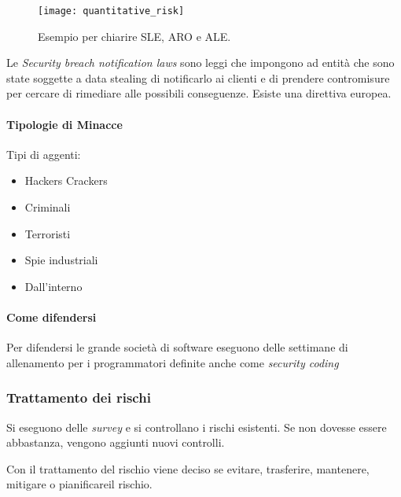 \begin{figure}[H]
 \centering
 \texttt{[image: quantitative\_risk]}
 \caption{Esempio per chiarire SLE, ARO e ALE.}
\end{figure}



Le \textit{Security breach notification laws} sono leggi che impongono ad entità
che sono state soggette a data stealing di notificarlo ai clienti e di prendere
contromisure per cercare di rimediare alle possibili conseguenze. Esiste una
direttiva europea.


\paragraph*{Tipologie di Minacce}

Tipi di aggenti:
\begin{itemize}
\item Hackers Crackers
\item Criminali
\item Terroristi
\item Spie industriali
\item Dall'interno
\end{itemize}


\paragraph*{Come difendersi}

Per difendersi le grande società di software eseguono delle settimane di
allenamento per i programmatori definite anche come \textit{security coding}



\subsubsection{Trattamento dei rischi}

Si eseguono delle \textit{survey} e si controllano i rischi esistenti. Se non
dovesse essere abbastanza, vengono aggiunti nuovi controlli.

Con il trattamento del rischio viene deciso se evitare, trasferire, mantenere,
mitigare o pianificareil rischio.

